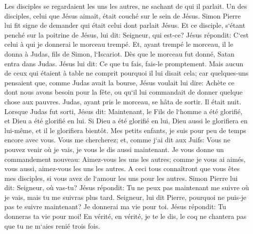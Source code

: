 \verse Les disciples se regardaient les uns les autres, ne sachant de qui il parlait. 
\verse Un des disciples, celui que Jésus aimait, était couché sur le sein de Jésus. 
\verse Simon Pierre lui fit signe de demander qui était celui dont parlait Jésus. 
\verse Et ce disciple, s`étant penché sur la poitrine de Jésus, lui dit: Seigneur, qui est-ce? 
\verse Jésus répondit: C`est celui à qui je donnerai le morceau trempé. Et, ayant trempé le morceau, il le donna à Judas, fils de Simon, l`Iscariot. 
\verse Dès que le morceau fut donné, Satan entra dans Judas. Jésus lui dit: Ce que tu fais, fais-le promptement. 
\verse Mais aucun de ceux qui étaient à table ne comprit pourquoi il lui disait cela; 
\verse car quelques-uns pensaient que, comme Judas avait la bourse, Jésus voulait lui dire: Achète ce dont nous avons besoin pour la fête, ou qu`il lui commandait de donner quelque chose aux pauvres. 
\verse Judas, ayant pris le morceau, se hâta de sortir. Il était nuit. 
\verse Lorsque Judas fut sorti, Jésus dit: Maintenant, le Fils de l`homme a été glorifié, et Dieu a été glorifié en lui. 
\verse Si Dieu a été glorifié en lui, Dieu aussi le glorifiera en lui-même, et il le glorifiera bientôt. 
\verse Mes petits enfants, je suis pour peu de temps encore avec vous. Vous me chercherez; et, comme j`ai dit aux Juifs: Vous ne pouvez venir où je vais, je vous le dis aussi maintenant. 
\verse Je vous donne un commandement nouveau: Aimez-vous les uns les autres; comme je vous ai aimés, vous aussi, aimez-vous les uns les autres. 
\verse A ceci tous connaîtront que vous êtes mes disciples, si vous avez de l`amour les uns pour les autres. 
\verse Simon Pierre lui dit: Seigneur, où vas-tu? Jésus répondit: Tu ne peux pas maintenant me suivre où je vais, mais tu me suivras plus tard. 
\verse Seigneur, lui dit Pierre, pourquoi ne puis-je pas te suivre maintenant? Je donnerai ma vie pour toi. 
\verse Jésus répondit: Tu donneras ta vie pour moi! En vérité, en vérité, je te le dis, le coq ne chantera pas que tu ne m`aies renié trois fois. 

\chapter{}

